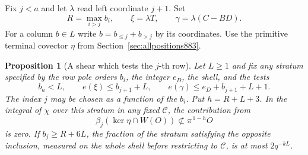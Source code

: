 \documentclass[a4paper,11pt]{article}
\newtheorem{proposition}{Proposition}[section]
\theoremstyle{definition}
\theoremstyle{remark}
\numberwithin{equation}{section}
\begin{document}
Fix \(j<a\) and let \(\lambda\) read left coordinate \(j+1\).
Set
\[
 R=\max_{i>j}b_i,\qquad \xi=\lambda T,\qquad
 \gamma=\lambda(C-BD).
\]
For a column \(b\in L\) write \(b=b_{\le j}+b_{>j}\) by its
coordinates. Use the primitive terminal covector \(\eta\) from
Section~\ref{sec:allpositions883}.

\begin{proposition}[A shear which tests the \(j\)-th row]
\leavevmode\label{prop:armshear887}
Let \(L\ge1\) and fix any stratum specified by the row pole
orders \(b_i\), the integer \(e_D\), the shell, and the tests
\[
 b_a<L,\qquad e(\xi)\le b_{j+1}+L,\qquad
 e(\gamma)\le e_D+b_{j+1}+L+1.
\]
The index \(j\) may be chosen as a function of the \(b_i\).
Put \(h=R+L+3\). In the integral of \(\chi\) over this stratum
in any fixed \(\mathcal C\), the contribution from
\begin{equation}
   \beta_j(\ker\eta\cap W(O))\not\subset\pi^{\,1-h}O
 \label{eq:cancelrow887}
\end{equation}
is zero. If \(b_j\ge R+6L\), the fraction of the stratum
satisfying the opposite inclusion, measured on the whole shell
before restricting to \(\mathcal C\), is at most \(2q^{-kL}\).
\end{proposition}
\end{document}
